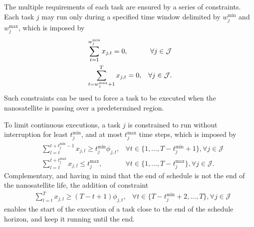 The multiple requirements of each task are ensured by a series of constraints.
Each task $j$ may run only during a specified time window delimited by $w_{j}^{\text{min}}$ and $w_{j}^{\text{max}}$, which is imposed by
\begin{equation}\label{eq:window-constraints}
    \begin{aligned}
        &\sum_{t=1}^{\textcolor{black}{w^{\min}_{j}}} x_{j,t} = 0,  & \forall j\in\mathcal{J} \\
        &\sum_{t=w^{\max}_{j}+1}^{T} x_{j,t} = 0, & \forall j\in\mathcal{J}
    .\end{aligned}
\end{equation}
Such constraints can be used to force a task to be executed when the nanosatellite is passing over a predetermined region.

To limit continuous executions, a task $j$ is constrained to run without interruption for least $t_j^{\text{min}}$, and at most $t_j^{\text{max}}$ time steps, which is imposed by
\begin{equation}\label{eq:execution-gap-constraints}
    \begin{aligned}
        &\sum_{l=t}^{t+{t}^{\min}_{j}-1} x_{j,l} \geq {t}^{\min}_{j} \phi_{j,t},  &\forall t \in \{1,...,T-{t}^{\min}_{j} + 1\}, \forall j\in\mathcal{J} \\
        &\sum_{l=t}^{t+{t}^{\max}_{j}} x_{j,l} \leq {t}^{\max}_{j},  &\forall t \in \{1,...,T-{t}^{\max}_{j}\}, \forall j\in\mathcal{J}
    .\end{aligned}
\end{equation}
Complementary, and having in mind that the end of schedule is not the end of the nanosatellite life, the addition of constraint
\begin{equation}\label{eq:execution-end-constraints}
    \begin{aligned}
        &\sum_{l=t}^{T} x_{j,l} \geq (T - t + 1) \phi_{j,t},  & \forall t \in \{T-{t}^{\min}_{j} + 2,...,T\}, \forall j\in\mathcal{J}
    \end{aligned}
\end{equation}
enables the start of the execution of a task close to the end of the schedule horizon, and keep it running until the end.

